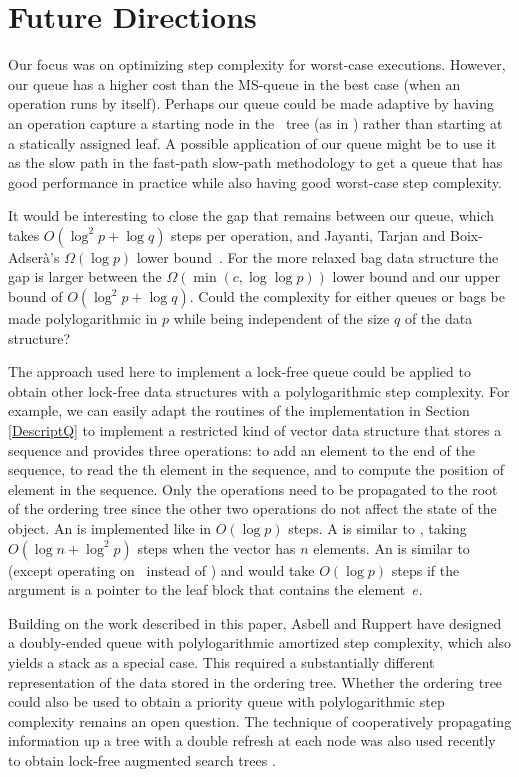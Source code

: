 
\section{Future Directions}

Our focus was on optimizing step complexity for worst-case executions.
However, our queue has a higher cost than the MS-queue in the best case (when an operation
runs by itself).
Perhaps our queue could be made adaptive by having an operation capture a starting node
in the \ordering\ tree (as in \cite{DBLP:conf/stoc/AfekDT95}) rather than starting at a statically assigned leaf.
A possible application of our queue  might be to use it as the slow path in the
fast-path slow-path methodology  \cite{10.1145/2370036.2145835} to
get a queue that has good performance in practice while also having good worst-case step complexity.

It would be interesting to close the gap that remains between our queue, which takes $O(\log^2 p + \log q)$ steps per operation,
and Jayanti, Tarjan and Boix-Adser\`{a}'s $\Omega(\log p)$ lower bound~\cite{JTB19}.
For the more relaxed bag data structure the gap is larger between the  $\Omega(\min(c,\log\log p))$ lower bound \cite{DBLP:conf/opodis/AttiyaF17} and our upper bound of $O(\log^2 p + \log q)$.
Could the complexity for either queues or bags be made polylogarithmic in $p$ while being independent of the size $q$ of the data structure?

The approach used here to implement a lock-free queue 
could be applied to obtain other lock-free
data structures with a polylogarithmic step complexity.
For example, we can easily adapt the routines of the implementation in Section \ref{DescriptQ} 
to implement a restricted kind of vector data structure that stores a sequence and
provides three operations:  to add an element  to the end of the sequence,
 to read the th element in the sequence, and
 to compute the position of element  in the sequence.
Only the  operations need to be propagated to the root of the ordering tree
since the other two operations do not affect the state of the object.
An  is implemented like  in $O(\log p)$ steps.  
A  is similar to , taking $O(\log n + \log^2p)$ steps when the vector has $n$ elements.  
An  is similar to  (except operating on \enqueues\ instead of \dequeues) and would take $O(\log p)$ steps if the argument is a pointer to the leaf block that contains the element~$e$.

Building on the work described in this paper, Asbell and Ruppert \cite{AR23} have
designed a doubly-ended queue with polylogarithmic amortized step
complexity, which also yields a stack as a special case.  
This required a substantially different representation of the data stored in the ordering tree.
Whether the ordering tree could also be used to obtain a priority queue with polylogarithmic step complexity
remains an open question.
The technique of cooperatively propagating information up a tree with a double refresh
at each node was also used recently to obtain lock-free augmented search trees \cite{FR24}.

